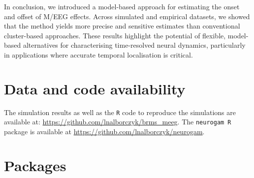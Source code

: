 \documentclass[
  doc,
  floatsintext,
  longtable,
  a4paper,
  nolmodern,
  notxfonts,
  notimes,
  colorlinks=true,linkcolor=blue,citecolor=blue,urlcolor=blue]{apa7}
\begin{document}
In conclusion, we introduced a model-based approach for estimating the
onset and offset of M/EEG effects. Across simulated and empirical
datasets, we showed that the method yields more precise and sensitive
estimates than conventional cluster-based approaches. These results
highlight the potential of flexible, model-based alternatives for
characterising time-resolved neural dynamics, particularly in
applications where accurate temporal localisation is critical.

\newpage

\setcounter{secnumdepth}{0}

\section{Data and code availability}\label{data-and-code-availability}

The simulation results as well as the \texttt{R} code to reproduce the
simulations are available at:
\url{https://github.com/lnalborczyk/brms_meeg}. The \texttt{neurogam\ R}
package is available at \url{https://github.com/lnalborczyk/neurogam}.

\section{Packages}\label{packages}
\end{document}

